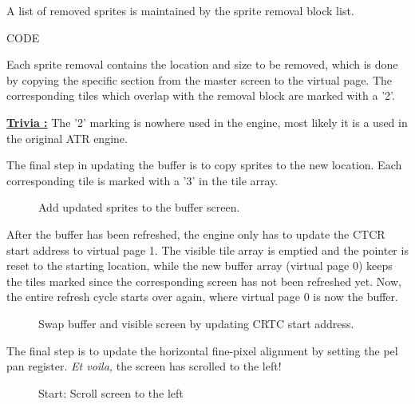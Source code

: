 \documentclass[book.tex]{subfiles}
\begin{document}
\pagebreak
A list of removed sprites is maintained by the sprite removal block list. \\
\par
CODE\\
\par
Each sprite removal contains the location and size to be removed, which is done by copying the specific section from the master screen to the virtual page. The corresponding tiles which overlap with the removal block are marked with a '2'.\\

\par
\textbf{\underline{Trivia :}} The '2' marking is nowhere used in the engine, most likely it is a used in the original ATR engine.\\
  \par
  
\par
The final step in updating the buffer is to copy sprites to the new location. Each corresponding tile is marked with a '3' in the tile array.

\begin{figure}[H]
\centering
 \caption{Add updated sprites to the buffer screen.}
 \label{fig:kc4_6_step4}
\end{figure}

\pagebreak

After the buffer has been refreshed, the engine only has to update the CTCR start address to virtual page 1. The visible tile array is emptied and the pointer is reset to the starting location, while the new buffer array (virtual page 0) keeps the tiles marked since the corresponding screen has not been refreshed yet. Now, the entire refresh cycle starts over again, where virtual page 0 is now the buffer.


\begin{figure}[H]
\centering
 \caption{Swap buffer and visible screen by updating CRTC start address.}
 \label{fig:kc4_6_step4}
\end{figure}

\pagebreak

The final step is to update the horizontal fine-pixel alignment by setting the pel pan register. \textit{Et voila,} the screen has scrolled to the left! \\
\begin{figure}[H]
\centering
 \caption{Start: Scroll screen to the left}
 \label{fig:kc4_6_start}
\end{figure}
\end{document}
